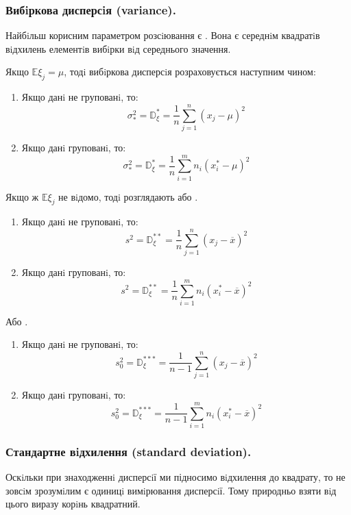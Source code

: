 \subsubsection{Вибiркова дисперсiя (variance).}
Найбiльш корисним параметром розсiювання є . Вона є середнiм квадратiв вiдхилень елементiв вибiрки вiд середнього значення.\par
Якщо $ \mathbb{E} \xi_j = \mu$, тодi вибiркова дисперсiя розраховується наступним чином:
\begin{spacing}{1}
\begin{enumerate}
    \item Якщо данi не групованi, то:
    $$
    \sigma_*^2 = \mathbb{D}^*_{\xi} = \frac{1}{n}  \sum\limits_{j = 1}^{n}{
    (x_j - \mu)^2
    }
    $$
    \item Якщо данi групованi, то:
    $$
    \sigma_*^2 = \mathbb{D}^*_{\xi} = \frac{1}{n}  \sum\limits_{i = 1}^{m}{n_i (x_i^* - \mu)^2}
    $$
\end{enumerate}
Якщо ж $\mathbb{E}\xi_j$ не вiдомо, тодi розглядають або .
\vspace*{-0.5em}
\begin{enumerate}
    \item Якщо данi не групованi, то:
    $$
    s^2 = \mathbb{D}^{**}_{\xi} = \frac{1}{n}  \sum\limits_{j = 1}^{n}{
    (x_j - \overline{x})^2
    }
    $$
    \item Якщо данi групованi, то:
    $$
    s^2 = \mathbb{D}^{**}_{\xi} = \frac{1}{n}  \sum\limits_{i = 1}^{m}{n_i (x_i^* - \overline{x})^2}
    $$
\end{enumerate}
\vspace*{-1em}
Або .
\vspace*{-0.5em}
\begin{enumerate}
    \item Якщо данi не групованi, то:
    $$
    s^2_0 = \mathbb{D}^{***}_{\xi} = \frac{1}{n-1}  \sum\limits_{j = 1}^{n}{
    (x_j - \overline{x})^2
    }
    $$
    \item Якщо данi групованi, то:
    $$
    s^2_0 = \mathbb{D}^{***}_{\xi} = \frac{1}{n-1}  \sum\limits_{i = 1}^{m}{n_i (x_i^* - \overline{x})^2}
    $$
\end{enumerate}
\end{spacing}
\subsubsection{Стандартне вiдхилення (standard deviation).}
Оскiльки при знаходженнi дисперсiї ми підносимо вiдхилення до квадрату, то не зовсiм зрозумiлим є одиницi вимiрювання дисперсiї. Тому природньо взяти вiд цього виразу корiнь квадратний. \par

